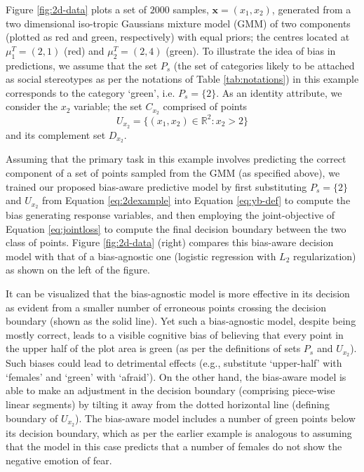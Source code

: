 \documentclass[letterpaper]{article}
\renewcommand{\vec}[1]{\mathbf{#1}}
\begin{document}
Figure \ref{fig:2d-data} plots a set of $2000$ samples, $\vec{x}=(x_1,x_2)$, generated from a two dimensional iso-tropic Gaussians mixture model (GMM) of two components (plotted as red and green, respectively) with equal priors; the centres located at $\mu_1^{T}=(2,1)$ (red) and $\mu_2^T=(2,4)$ (green). To illustrate the idea of bias in predictions, we assume that the set $P_s$ (the set of categories likely to be attached as social stereotypes as per the notations of Table \ref{tab:notations}) in this example corresponds to the category `green', i.e. $P_s=\{2\}$. As an identity attribute, we consider the $x_2$ variable; the set $C_{x_2}$ comprised of points
\begin{equation}
U_{x_2}=\{(x_1,x_2) \in \mathbb{R}^2: x_2 > 2\} \label{eq:2dexample}
\end{equation}
and its complement set $D_{x_2}$.

Assuming that the primary task in this example involves predicting the correct component of a set of points sampled from the GMM (as specified above), we trained our proposed bias-aware predictive model by first substituting $P_s=\{2\}$ and $U_{x_2}$ from Equation \ref{eq:2dexample} into Equation \ref{eq:yb-def} to compute the bias generating response variables, and then employing the joint-objective of Equation \ref{eq:jointloss} to compute the final decision boundary between the two class of points. Figure \ref{fig:2d-data} (right) compares this bias-aware decision model with that of a bias-agnostic one (logistic regression with $L_2$ regularization) as shown on the left of the figure.

It can be visualized that the bias-agnostic model is more effective in its decision as evident from a smaller number of erroneous points crossing the decision boundary (shown as the solid line). Yet such a bias-agnostic model, despite being mostly correct, leads to a visible cognitive bias of believing that every point in the upper half of the plot area is green (as per the definitions of sets $P_s$ and $U_{x_2}$). Such biases could lead to detrimental effects (e.g., substitute
`upper-half' with `females' and `green' with `afraid').
On the other hand, the bias-aware model is able to make an adjustment in the decision boundary (comprising piece-wise linear segments) by tilting it away from the dotted horizontal line (defining boundary of $U_{x_2}$). The bias-aware model includes a number of green points below its decision boundary, which as per the earlier example is analogous to assuming that the model in this case predicts that a number of females do not show the negative emotion of fear.
\end{document}
